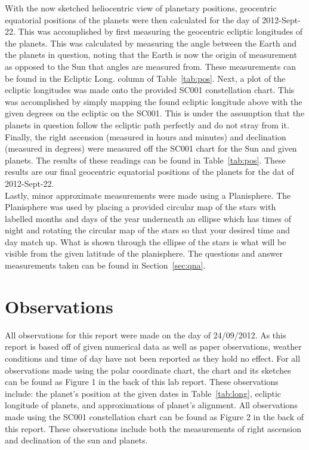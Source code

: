 \documentclass{article}
\begin{document}
With the now sketched heliocentric view of planetary positions, geocentric equatorial positions of the planets were then
calculated for the day of 2012-Sept-22. This was accomplished by first measuring the geocentric ecliptic longitudes of the planets.
This was calculated by measuring the angle between the Earth and the planets in question, noting that the Earth is now the origin 
of measurement as opposed to the Sun that angles are measured from. These measurements can be found in the 
Ecliptic Long. column of Table~\ref{tab:pos}. Next, a plot of the ecliptic longitudes was made onto the provided SC001
constellation chart. This was accomplished by simply mapping the found ecliptic longitude above with the given degrees on
the ecliptic on the SC001. This is under the assumption that the planets in question follow the ecliptic path perfectly and do not
stray from it. Finally, the right ascension (measured in hours and minutes) and declination (measured in degrees)
were measured off the SC001 chart for the Sun and given planets. The results of these readings can be found in Table~\ref{tab:pos}.
These results are our final geocentric equatorial positions of the planets for the dat of 2012-Sept-22.\\

Lastly, minor approximate measurements were made using a Planisphere. The Planisphere was used by placing a provided circular
map of the stars with labelled months and days of the year underneath an ellipse which has times of night and rotating the 
circular map of the stars so that your desired time and day match up. What is shown through the ellipse of the stars is what will 
be visible from the given latitude of the planisphere. The questions and answer measurements taken can be found in
Section~\ref{sec:qna}.\\



\section{Observations}

All observations for this report were made on the day of 24/09/2012. As this report is based off of given numerical data as
well as paper observations, weather conditions and time of day have not been reported as they hold no effect. For all 
observations made using the polar coordinate chart, the chart and its sketches can be found as Figure 1 in the back of
this lab report. These observations include: the planet's position at the given dates in Table~\ref{tab:long}, ecliptic 
longitude of planets, and approximations of planet's alignment. All observations made using the SC001 constellation
chart can be found as Figure 2 in the back of this report. These observations include both the measurements of right
ascension and declination of the sun and planets.\\
\end{document}
